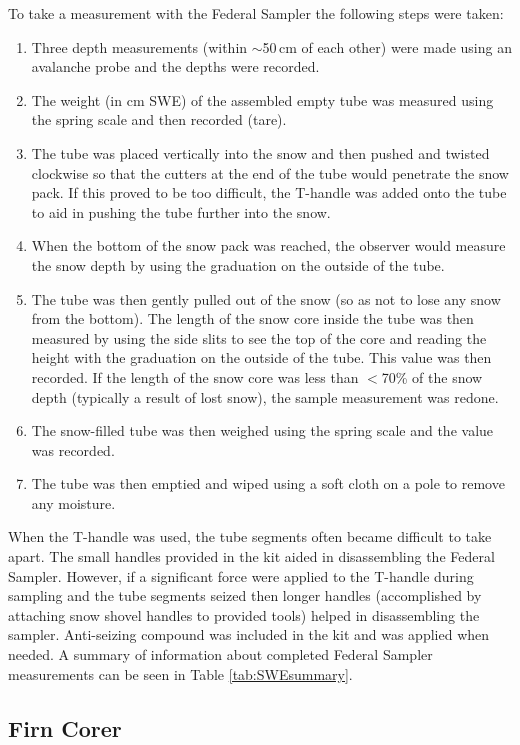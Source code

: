 \documentclass{sfuthesis}
\begin{document}
To take a measurement with the Federal Sampler the following steps were taken:
\begin{enumerate}
\item Three depth measurements (within $\sim$50\,cm of each other) were made using an avalanche probe and the depths were recorded.
\item The weight (in cm SWE) of the assembled empty tube was measured using the spring scale and then recorded (tare).
\item The tube was placed vertically into the snow and then pushed and twisted clockwise so that the cutters at the end of the tube would penetrate the snow pack. If this proved to be too difficult, the T-handle was added onto the tube to aid in pushing the tube further into the snow. 
\item When the bottom of the snow pack was reached, the observer would measure the snow depth by using the graduation on the outside of the tube.
\item The tube was then gently pulled out of the snow (so as not to lose any snow from the bottom). The length of the snow core inside the tube was then measured by using the side slits to see the top of the core and reading the height with the graduation on the outside of the tube. This value was then recorded. If the length of the snow core was less than $<$70\% of the snow depth (typically a result of lost snow), the sample measurement was redone.
\item The snow-filled tube was then weighed using the spring scale and the value was recorded.
\item The tube was then emptied and wiped using a soft cloth on a pole to remove any moisture. 
\end{enumerate}

When the T-handle was used, the tube segments often became difficult to take apart. The small handles provided in the kit aided in disassembling the Federal Sampler. However, if a significant force were applied to the T-handle during sampling and the tube segments seized then longer handles (accomplished by attaching snow shovel handles to provided tools) helped in disassembling the sampler. Anti-seizing compound was included in the kit and was applied when needed. A summary of information about completed Federal Sampler measurements can be seen in Table \ref{tab:SWEsummary}.

\subsection{Firn Corer}
\end{document}

